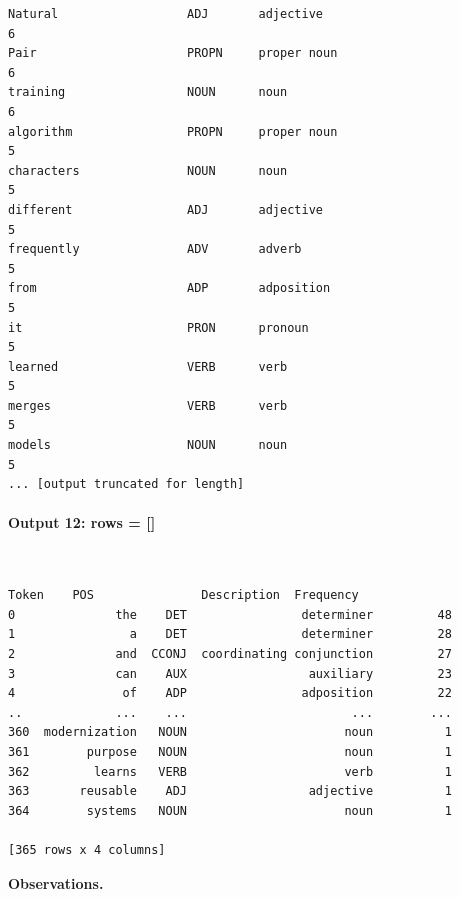 \documentclass[12pt,a4paper,oneside]{report}
\begin{document}
\begin{Verbatim}[commandchars=\\\{\},breaklines=true,breakanywhere=true,fontsize=\scriptsize,frame=leftline,framesep=2mm,rulecolor=\color{gray}]
Natural                  ADJ       adjective                          6
Pair                     PROPN     proper noun                        6
training                 NOUN      noun                               6
algorithm                PROPN     proper noun                        5
characters               NOUN      noun                               5
different                ADJ       adjective                          5
frequently               ADV       adverb                             5
from                     ADP       adposition                         5
it                       PRON      pronoun                            5
learned                  VERB      verb                               5
merges                   VERB      verb                               5
models                   NOUN      noun                               5
... [output truncated for length]
\end{Verbatim}
\paragraph{Output 12: rows = []}\mbox{}\\[-1ex]
\begin{Verbatim}[commandchars=\\\{\},breaklines=true,breakanywhere=true,fontsize=\scriptsize,frame=leftline,framesep=2mm,rulecolor=\color{gray}]
             Token    POS               Description  Frequency
0              the    DET                determiner         48
1                a    DET                determiner         28
2              and  CCONJ  coordinating conjunction         27
3              can    AUX                 auxiliary         23
4               of    ADP                adposition         22
..             ...    ...                       ...        ...
360  modernization   NOUN                      noun          1
361        purpose   NOUN                      noun          1
362         learns   VERB                      verb          1
363       reusable    ADJ                 adjective          1
364        systems   NOUN                      noun          1

[365 rows x 4 columns]
\end{Verbatim}
\textbf{Observations.}
\end{document}
